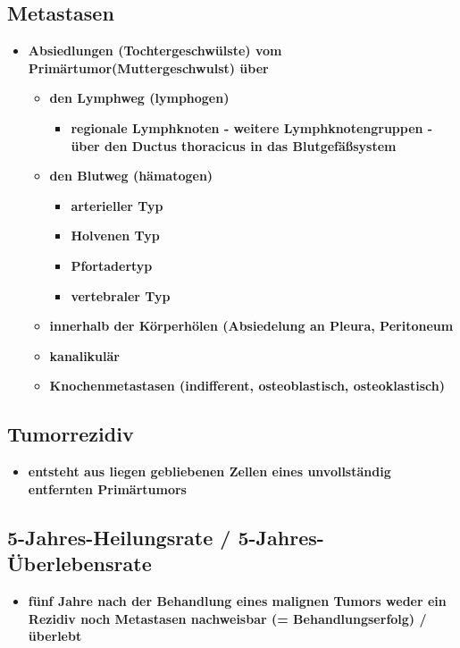 	\subsection{Metastasen}
		\begin{itemize}
			\item \textbf{Absiedlungen (Tochtergeschwülste) vom Primärtumor(Muttergeschwulst) über}
				\begin{itemize}
					\item \textbf{den Lymphweg (lymphogen)}
						\begin{itemize}
							\item \textbf{regionale Lymphknoten - weitere Lymphknotengruppen - über den Ductus thoracicus in das Blutgefäßsystem}
						\end{itemize}
					\item \textbf{den Blutweg (hämatogen)}
						\begin{itemize}
							\item \textbf{arterieller Typ}
							\item \textbf{Holvenen Typ}
							\item \textbf{Pfortadertyp}
							\item \textbf{vertebraler Typ}
						\end{itemize}
					\item \textbf{innerhalb der Körperhölen (Absiedelung an Pleura, Peritoneum}
					\item \textbf{kanalikulär}
					\item \textbf{Knochenmetastasen (indifferent, osteoblastisch, osteoklastisch)}
				\end{itemize}
		\end{itemize}
	\subsection{Tumorrezidiv}
		\begin{itemize}
			\item \textbf{entsteht aus liegen gebliebenen Zellen eines unvollständig entfernten Primärtumors}
		\end{itemize}
	\subsection{5-Jahres-Heilungsrate / 5-Jahres-Überlebensrate}
		\begin{itemize}
			\item \textbf{fünf Jahre nach der Behandlung eines malignen Tumors weder ein Rezidiv noch Metastasen nachweisbar (= Behandlungserfolg) / überlebt}
		\end{itemize}
